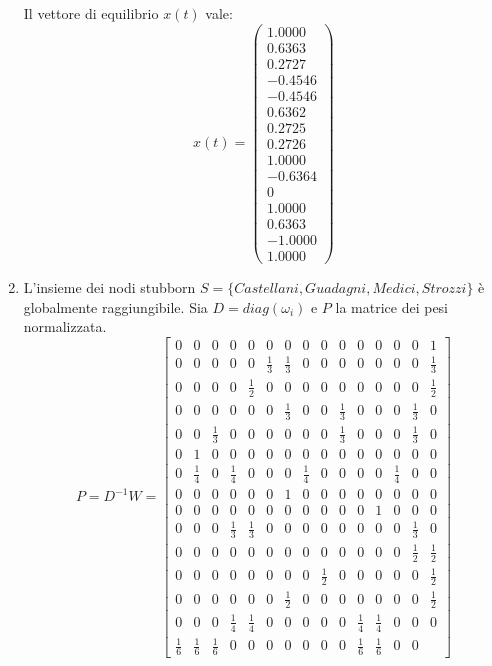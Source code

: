 \documentclass[13pt,largemargins]{homework}
\begin{document}
\begin{enumerate}[label=(\alph*)]
Il vettore di equilibrio $x(t)$ vale: 
\[x(t)=\begin{pmatrix}
    1.0000 \\
    0.6363 \\
    0.2727 \\
   -0.4546 \\
   -0.4546 \\	
    0.6362 \\
    0.2725 \\
    0.2726 \\
    1.0000 \\
   -0.6364 \\
         0 \\
    1.0000 \\
    0.6363 \\
   -1.0000 \\
    1.0000    
\end{pmatrix}\]
\item%
L'insieme dei nodi stubborn $S=\{Castellani, Guadagni, Medici, Strozzi\}$ è globalmente raggiungibile. Sia $D=diag(\omega_i)$ e \(P\) la matrice dei pesi normalizzata. 
\[P=D^{-1}W=\begin{bmatrix} 
0 & 0 & 0 & 0 & 0 & 0 & 0 & 0 & 0 & 0 & 0 & 0 & 0 & 0 & 1\\
0 & 0 & 0 & 0 & 0 & \frac{1}{3} & \frac{1}{3} & 0 & 0 & 0 & 0 & 0 & 0 & 0 & \frac{1}{3} \\
0 & 0 & 0 & 0 & \frac{1}{2} & 0 & 0 & 0 & 0 & 0 & 0 & 0 & 0 & 0 & \frac{1}{2}\\
0 & 0 & 0 & 0 & 0 & 0 & \frac{1}{3} & 0 & 0 & \frac{1}{3} & 0 & 0 & 0 & \frac{1}{3} & 0\\
0 & 0 & \frac{1}{3} & 0 & 0 & 0 & 0 & 0 & 0 & \frac{1}{3} & 0 & 0 & 0 & \frac{1}{3} & 0\\
0 & 1 & 0 & 0 & 0 & 0 & 0 & 0 & 0 & 0 & 0 & 0 & 0 & 0 & 0\\
0 & \frac{1}{4} & 0 & \frac{1}{4} & 0 & 0 & 0 & \frac{1}{4} & 0 & 0 & 0 & 0 & \frac{1}{4} & 0 & 0\\
0 & 0 & 0 & 0 & 0 & 0 & 1 & 0 & 0 & 0 & 0 & 0 & 0 & 0 & 0\\
0 & 0 & 0 & 0 & 0 & 0 & 0 & 0 & 0 & 0 & 0 & 1 & 0 & 0 & 0\\
0 & 0 & 0 & \frac{1}{3} & \frac{1}{3} & 0 & 0 & 0 & 0 & 0 & 0 & 0 & 0 & \frac{1}{3} & 0\\
0 & 0 & 0 & 0 & 0 & 0 & 0 & 0 & 0 & 0 & 0 & 0 & 0 & \frac{1}{2} & \frac{1}{2}\\
0 & 0 & 0 & 0 & 0 & 0 & 0 & 0 & \frac{1}{2} & 0 & 0 & 0 & 0 & 0 & \frac{1}{2}\\
0 & 0 & 0 & 0 & 0 & 0 & \frac{1}{2} & 0 & 0 & 0 & 0 & 0 & 0 & 0 & \frac{1}{2}\\
0 & 0 & 0 & \frac{1}{4} & \frac{1}{4} & 0 & 0 & 0 & 0 & 0 & \frac{1}{4} & \frac{1}{4} & 0 & 0 & 0\\
\frac{1}{6} & \frac{1}{6} & \frac{1}{6} & 0 & 0 & 0 & 0 & 0 & 0 & 0 & \frac{1}{6} & \frac{1}{6} & 0 & 0
\end{bmatrix}\]
 


\end{enumerate}
\end{document}
